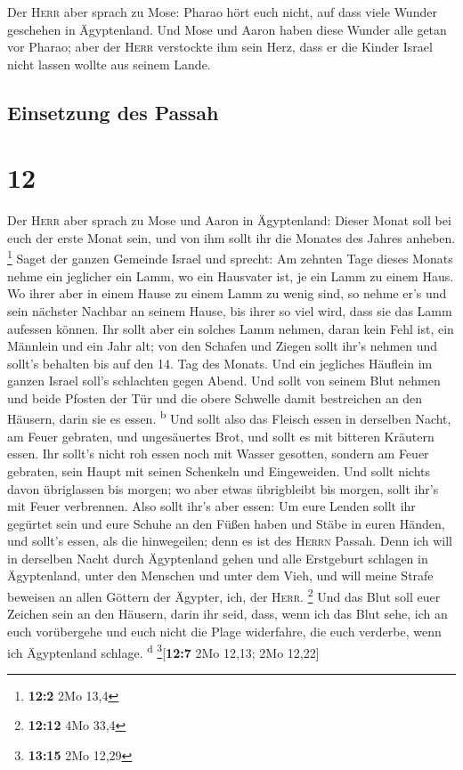  Der \textsc{Herr} aber sprach zu Mose: Pharao hört euch
nicht, auf dass viele Wunder geschehen in Ägyptenland. 
Und Mose und Aaron haben diese Wunder alle getan vor Pharao; aber der
\textsc{Herr} verstockte ihm sein Herz, dass er die Kinder Israel nicht
lassen wollte aus seinem Lande.

\hypertarget{einsetzung-des-passah}{%
\subsection{Einsetzung des Passah}\label{einsetzung-des-passah}}

\hypertarget{section-11}{%
\section{12}\label{section-11}}

 Der \textsc{Herr} aber sprach zu Mose und Aaron in
Ägyptenland:  Dieser Monat soll bei euch der erste Monat
sein, und von ihm sollt ihr die Monates des Jahres anheben. \footnote{\textbf{12:2}
  2Mo 13,4}  Saget der ganzen Gemeinde Israel und sprecht:
Am zehnten Tage dieses Monats nehme ein jeglicher ein Lamm, wo ein
Hausvater ist, je ein Lamm zu einem Haus.  Wo ihrer aber
in einem Hause zu einem Lamm zu wenig sind, so nehme er's und sein
nächster Nachbar an seinem Hause, bis ihrer so viel wird, dass sie das
Lamm aufessen können.  Ihr sollt aber ein solches Lamm
nehmen, daran kein Fehl ist, ein Männlein und ein Jahr alt; von den
Schafen und Ziegen sollt ihr's nehmen  und sollt's
behalten bis auf den 14. Tag des Monats. Und ein jegliches Häuflein im
ganzen Israel soll's schlachten gegen Abend.  Und sollt
von seinem Blut nehmen und beide Pfosten der Tür und die obere Schwelle
damit bestreichen an den Häusern, darin sie es essen.
\textsuperscript{b}  Und sollt also das Fleisch essen in
derselben Nacht, am Feuer gebraten, und ungesäuertes Brot, und sollt es
mit bitteren Kräutern essen.  Ihr sollt's nicht roh essen
noch mit Wasser gesotten, sondern am Feuer gebraten, sein Haupt mit
seinen Schenkeln und Eingeweiden.  Und sollt nichts davon
übriglassen bis morgen; wo aber etwas übrigbleibt bis morgen, sollt
ihr's mit Feuer verbrennen.  Also sollt ihr's aber essen:
Um eure Lenden sollt ihr gegürtet sein und eure Schuhe an den Füßen
haben und Stäbe in euren Händen, und sollt's essen, als die hinwegeilen;
denn es ist des \textsc{Herrn} Passah.  Denn ich will in
derselben Nacht durch Ägyptenland gehen und alle Erstgeburt schlagen in
Ägyptenland, unter den Menschen und unter dem Vieh, und will meine
Strafe beweisen an allen Göttern der Ägypter, ich, der \textsc{Herr}.
\footnote{\textbf{12:12} 4Mo 33,4}  Und das Blut soll
euer Zeichen sein an den Häusern, darin ihr seid, dass, wenn ich das
Blut sehe, ich an euch vorübergehe und euch nicht die Plage widerfahre,
die euch verderbe, wenn ich Ägyptenland schlage. \textsuperscript{d}
\footnote{\textbf{13:15} 2Mo 12,29}{[}\textbf{12:7} 2Mo 12,13; 2Mo
12,22{]}

